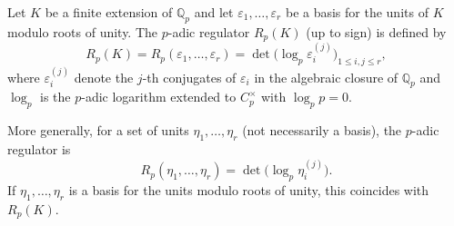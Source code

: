 Let $K$ be a finite extension of $\mathbb{Q}_p$ and let $\varepsilon_1, \dots, \varepsilon_r$ be a basis for the units of $K$ modulo roots of unity. The $p$-adic regulator $R_p(K)$ (up to sign) is defined by
$$
R_p(K) = R_p(\varepsilon_1, \dots, \varepsilon_r) = \det\!\bigl( \log_p \varepsilon_i^{(j)} \bigr)_{1 \leq i,j \leq r},
$$
where $\varepsilon_i^{(j)}$ denote the $j$-th conjugates of $\varepsilon_i$ in the algebraic closure of $\mathbb{Q}_p$ and $\log_p$ is the $p$-adic logarithm extended to $C_p^\times$ with $\log_p p = 0$.

More generally, for a set of units $\eta_1, \dots, \eta_r$ (not necessarily a basis), the $p$-adic regulator is
$$
R_p(\eta_1, \dots, \eta_r) = \det\!\bigl( \log_p \eta_i^{(j)} \bigr).
$$
If $\eta_1, \dots, \eta_r$ is a basis for the units modulo roots of unity, this coincides with $R_p(K)$.
